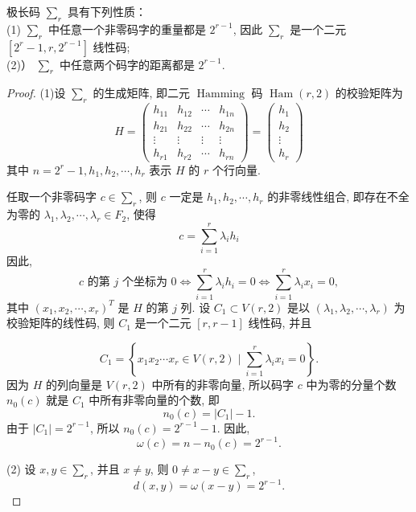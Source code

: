 \begin{theorem}
    极长码 $ \sum_{r} $ 具有下列性质：\\
 (1) $ \sum_{r} $ 中任意一个非零码字的重量都是 $ 2^{r-1} $, 因此 $ \sum_{r} $ 是一个二元 $ \left[2^{r}-1, r, 2^{r-1}\right] $ 线性码;\\
(2)） $ \sum_{r} $ 中任意两个码字的距离都是 $ 2^{r-1} $.
\end{theorem}
\begin{proof}
    (1)设 $ \sum_{r} $ 的生成矩阵, 即二元 $ \operatorname{Hamming} $ 码 $ \operatorname{Ham}(r, 2) $ 的校验矩阵为
$$
H=\left(\begin{array}{cccc}
h_{11} & h_{12} & \cdots & h_{1 n} \\
h_{21} & h_{22} & \cdots & h_{2 n} \\
\vdots & \vdots & \vdots & \vdots \\
h_{r 1} & h_{r 2} & \cdots & h_{r n}
\end{array}\right)=\left(\begin{array}{c}
h_{1} \\
h_{2} \\
\vdots \\
h_{r}
\end{array}\right)
$$
其中 $ n=2^{r}-1, h_{1}, h_{2}, \cdots, h_{r} $ 表示 $ H $ 的 $ r $ 个行向量.

任取一个非零码字 $ c \in \sum_{r} $, 则 $ c $ 一定是 $ h_{1}, h_{2}, \cdots, h_{r} $ 的非零线性组合, 即存在不全为零的 $ \lambda_{1}, \lambda_{2}, \cdots, \lambda_{r} \in F_{2} $, 使得
$$
c=\sum_{i=1}^{r} \lambda_{i} h_{i}
$$
因此,
$$
c \text { 的第 } j \text { 个坐标为 } 0 \Longleftrightarrow \sum_{i=1}^{r} \lambda_{i} h_{i}=0 \Longleftrightarrow \sum_{i=1}^{r} \lambda_{i} x_{i}=0,
$$
其中 $ \left(x_{1}, x_{2}, \cdots, x_{r}\right)^{T} $ 是 $ H $ 的第 $ j $ 列.
设 $ C_{1} \subset V(r, 2) $ 是以 $ \left(\lambda_{1}, \lambda_{2}, \cdots, \lambda_{r}\right) $ 为校验矩阵的线性码, 则 $ C_{1} $ 是一个二元 $ [r, r-1] $ 线性码, 并且

$$
C_{1}=\left\{x_{1} x_{2} \cdots x_{r} \in V(r, 2) \mid \sum_{i=1}^{r} \lambda_{i} x_{i}=0\right\} .
$$
因为 $ H $ 的列向量是 $ V(r, 2) $ 中所有的非零向量, 所以码字 $ c $ 中为零的分量个数 $ n_{0}(c) $ 就是 $ C_{1} $ 中所有非零向量的个数, 即
$$
n_{0}(c)=\left|C_{1}\right|-1 .
$$
由于 $ \left|C_{1}\right|=2^{r-1} $, 所以 $ n_{0}(c)=2^{r-1}-1 $. 因此,
$$
\omega(c)=n-n_{0}(c)=2^{r-1} .
$$

(2) 设 $ x, y \in \sum_{r} $, 并且 $ x \neq y $, 则 $ 0 \neq x-y \in \sum_{r} $,
$$
d(x, y)=\omega(x-y)=2^{r-1} .
$$
\end{proof}


